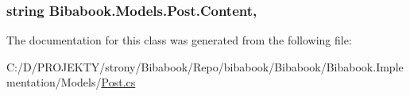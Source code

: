 \subsubsection[{Content}]{\setlength{\rightskip}{0pt plus 5cm}string Bibabook.\+Models.\+Post.\+Content\hspace{0.3cm}{\ttfamily [get]}, {\ttfamily [set]}}\label{class_bibabook_1_1_models_1_1_post_a9c15b7975ca6607251461110097aa280}


The documentation for this class was generated from the following file\+:\begin{DoxyCompactItemize}
\item 
C\+:/\+D/\+P\+R\+O\+J\+E\+K\+T\+Y/strony/\+Bibabook/\+Repo/bibabook/\+Bibabook/\+Bibabook.\+Implementation/\+Models/\hyperlink{_post_8cs}{Post.\+cs}\end{DoxyCompactItemize}
